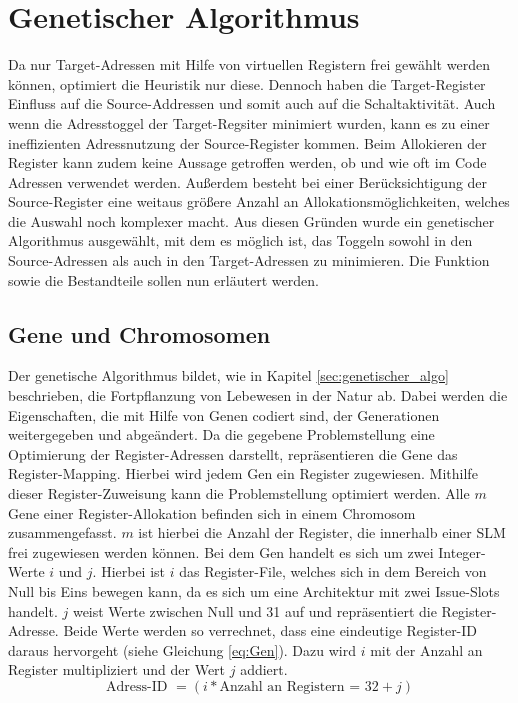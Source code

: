 \section{Genetischer Algorithmus}
\label{sec:genetischerAlgorithmus}
Da nur Target-Adressen mit Hilfe von virtuellen Registern frei gewählt werden können, optimiert die Heuristik nur diese. Dennoch haben die Target-Register Einfluss auf die Source-Addressen und somit auch auf die Schaltaktivität. Auch wenn die Adresstoggel der Target-Regsiter minimiert wurden, kann es zu einer ineffizienten Adressnutzung der Source-Register kommen. Beim Allokieren der Register kann zudem keine Aussage getroffen werden, ob und wie oft im Code Adressen verwendet werden. Außerdem besteht bei einer Berücksichtigung der Source-Register eine weitaus größere Anzahl an Allokationsmöglichkeiten, welches die Auswahl noch komplexer macht. Aus diesen Gründen wurde ein genetischer Algorithmus ausgewählt, mit dem es möglich ist, das Toggeln sowohl in den Source-Adressen als auch in den Target-Adressen zu minimieren. Die Funktion sowie die Bestandteile sollen nun erläutert werden.

\subsection{Gene und Chromosomen}
Der genetische Algorithmus bildet, wie in Kapitel \ref{sec:genetischer_algo} beschrieben, die Fortpflanzung von Lebewesen in der Natur ab. Dabei werden die Eigenschaften, die mit Hilfe von Genen codiert sind, der Generationen weitergegeben und abgeändert. Da die gegebene Problemstellung eine Optimierung der Register-Adressen darstellt, repräsentieren die Gene das Register-Mapping. Hierbei wird jedem Gen ein Register zugewiesen. Mithilfe dieser Register-Zuweisung kann die Problemstellung optimiert werden.
Alle $m$ Gene einer Register-Allokation befinden sich in einem Chromosom zusammengefasst. $m$ ist hierbei die Anzahl der Register, die innerhalb einer SLM frei zugewiesen werden können. Bei dem Gen handelt es sich um zwei Integer-Werte $i$ und $j$. Hierbei ist $i$ das Register-File, welches sich in dem Bereich von Null bis Eins bewegen kann, da es sich um eine Architektur mit zwei Issue-Slots handelt. $j$ weist Werte zwischen Null und 31 auf und repräsentiert die Register-Adresse. Beide Werte werden so verrechnet, dass eine eindeutige Register-ID daraus hervorgeht (siehe Gleichung \ref{eq:Gen}). Dazu wird $i$ mit der Anzahl an Register multipliziert und der Wert $j$ addiert. 
\begin{equation}
\text{Adress-ID }= (i* \text{Anzahl an Registern = 32}+ j)
\label{eq:Gen}
\end{equation}
 
